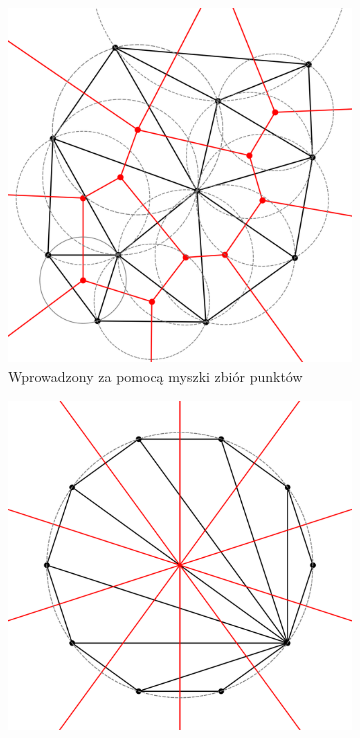 \documentclass{myclass}
\begin{document}
\begin{figure}[ht]
    \centering
    \begin{subfigure}[b]{0.3\textwidth}
        \centering
        \includegraphics[width=\textwidth]{figs/voronoi1.png}
        \caption{Wprowadzony za pomocą myszki zbiór punktów}
    \end{subfigure}
    \hfill
    \begin{subfigure}[b]{0.3\textwidth}
        \centering
        \includegraphics[width=\textwidth]{figs/voronoi2.png}

\end{subfigure}
\end{figure}
\end{document}
